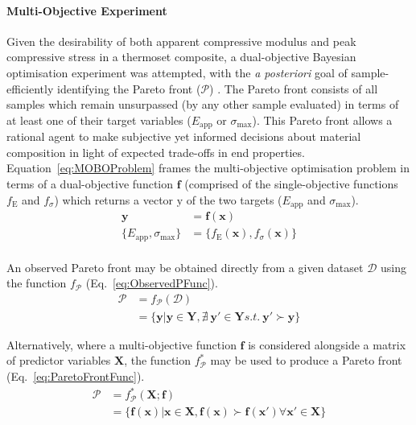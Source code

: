 \paragraph{Multi-Objective Experiment}
Given the desirability of both apparent compressive modulus and 
 peak compressive stress in a thermoset composite, a dual-objective Bayesian
 optimisation experiment was attempted, with the \textit{a posteriori} goal of 
 sample-efficiently identifying the Pareto front (\(\mathcal{P}\)) 
 \autocite{Garnett2023}.
The Pareto front consists of all samples which remain unsurpassed (by any
 other sample evaluated) in terms of at least one of their target variables
 (\(E_{\text{app}}\) or \(\sigma_{\text{max}}\)).
This Pareto front allows a rational agent to make subjective yet informed
 decisions about material composition in light of expected trade-offs in
 end properties.
Equation~\ref{eq:MOBOProblem} frames the multi-objective optimisation
 problem in terms of a dual-objective function \(\mathbf{f}\) (comprised of
 the single-objective functions \(f_{\mathrm{E}}\) and \(f_{\sigma}\)) which returns
 a vector \(\mathbf{\mathrm{y}}\) of the two targets (\(E_{\text{app}}\) and 
 \(\sigma_{\text{max}}\)).
\begin{equation}\label{eq:MOBOProblem}
    \begin{split}
        \mathbf{y}&=\mathbf{f}(\mathbf{x})\\
        \{E_{\text{app}},\sigma_{\text{max}}\}&=\{f_{\mathrm{E}}(\mathbf{x}),f_{\sigma}(\mathbf{x})\}\\
    \end{split}
\end{equation}

An observed Pareto front may be obtained directly from a given dataset
 \(\mathcal{D}\) using the function \(f_\mathcal{P}\)
 (Eq.~\ref{eq:ObservedPFunc}).
\begin{equation}\label{eq:ObservedPFunc}
    \begin{split}
        \mathcal{P}&=f_\mathcal{P}(\mathcal{D})\\
        &=\{\mathbf{y}|\mathbf{y}\in\mathbf{Y},\nexists\:\mathbf{y}'\in\mathbf{Y}s.t.\:\mathbf{y}'\succ\mathbf{y}\}
    \end{split}
\end{equation}

Alternatively, where a multi-objective function \(\mathbf{f}\) is
 considered alongside a matrix of predictor variables \(\mathbf{X}\), the
 function \(f_\mathcal{P}^{*}\) may be used to produce a Pareto
 front (Eq.~\ref{eq:ParetoFrontFunc}).
\small
\begin{equation}\label{eq:ParetoFrontFunc}
    \begin{split}
        \mathcal{P}&=f_{\mathcal{P}}^{*}(\mathbf{X};\mathbf{f})\\
        &=\{\mathbf{f}(\mathbf{x})|\mathbf{x}\in\mathbf{X},\mathbf{f}(\mathbf{x})\succ\mathbf{f}(\mathbf{x}')\forall\mathbf{x}'\in\mathbf{X}\}
    \end{split}
\end{equation}
\normalsize

